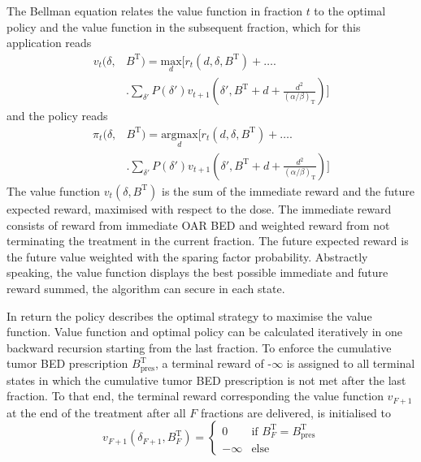 \documentclass[\relativeRoot/ada.tex]{subfiles}
\begin{document}
The Bellman equation relates the value function in fraction $t$ to the optimal policy and the value function in the subsequent fraction, which for this application reads
\begin{equation}\label{eq:value_function}
    \begin{split}
    v_t(\delta, & B^{\text{T}}) = \underset{d}{\text{max}} \Biggr[
    r_t(d, \delta, B^{\text{T}}) + \ldots \Biggr.\\
    & \Biggr. \sum_{\delta'}P(\delta')v_{t+1} \left( \delta', B^{\text{T}} + d + \frac{d^2}{(\alpha / \beta)_\text{T}} \right) \Biggr]
    \end{split}
\end{equation}
and the policy reads
\begin{equation}\label{eq:policy_function}
    \begin{split}
    \pi_t(\delta, & B^{\text{T}}) = \underset{d}{\text{argmax}} \Biggr[
    r_t(d, \delta, B^{\text{T}}) + \ldots \Biggr.\\
    & \Biggr. \sum_{\delta'}P(\delta')v_{t+1} \left( \delta', B^{\text{T}} + d + \frac{d^2}{(\alpha / \beta)_\text{T}} \right) \Biggr]
    \end{split}
\end{equation}
The value function $v_t(\delta, B^{\text{T}})$ is the sum of the immediate reward and the future expected reward, maximised with respect to the dose. The immediate reward consists of reward from immediate OAR BED and weighted reward from not terminating the treatment in the current fraction. The future expected reward is the future value weighted with the sparing factor probability. Abstractly speaking, the value function displays the best possible immediate and future reward summed, the algorithm can secure in each state.

In return the policy describes the optimal strategy to maximise the value function. Value function and optimal policy can be calculated iteratively in one backward recursion starting from the last fraction. To enforce the cumulative tumor BED prescription $B_{\text{pres}}^\text{T}$, a terminal reward of -$\infty$ is assigned to all terminal states in which the cumulative tumor BED prescription is not met after the last fraction. To that end, the terminal reward corresponding the value function $v_{F+1}$ at the end of the treatment after all $F$ fractions are delivered, is initialised to
\begin{equation*}
v_{F+1}(\delta_{F+1}, B^\text{T}_{F}) = 
\begin{cases}
0 & \text{if } B^\text{T}_F = B_{\text{pres}}^\text{T} \\
-\infty & \text{else}
\end{cases}
\end{equation*}
\end{document}
